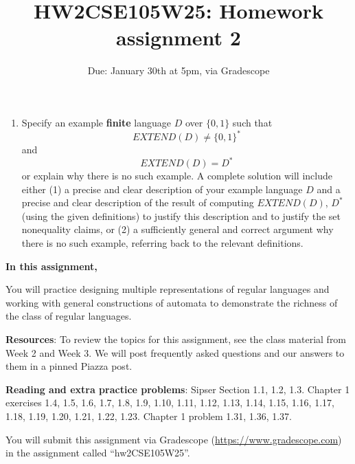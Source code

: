 \begin{enumerate}[wide, labelwidth=!, labelindent=0pt]
\begin{enumerate}
    \item\gradeCorrect Specify an example {\bf finite} language $D$ over $\{0,1\}$ such that 
    $$EXTEND(D) \neq \{0,1\}^*$$ and $$EXTEND(D) = D^*$$or 
    explain why there is no such example.
    A complete solution will include either (1) a precise and
    clear description of your example language $D$ 
    and a precise and clear description of
    the result of computing $EXTEND(D)$, $D^*$ (using the given definitions)
    to justify this description and to justify the set nonequality claims, 
    or (2) a sufficiently general and correct argument
    why there is no such example, referring back to the relevant definitions.
    \end{enumerate}



    
    \end{enumerate}
\newpage

\title{HW2CSE105W25: Homework assignment 2}
\date{Due: January 30th at 5pm, via Gradescope}



\maketitle
\thispagestyle{fancy}

{\bf In this assignment,}

You will practice designing multiple representations of regular languages and working with 
general constructions of automata to demonstrate the richness of the class of regular languages.


{\bf Resources}: To review the topics 
for this assignment, see the class material from Week 2 and Week 3.
We will post frequently asked questions and our answers to them in a 
pinned Piazza post. 

{\bf Reading and extra practice problems}:  
Sipser Section 1.1, 1.2, 1.3. 
Chapter 1 exercises 1.4, 1.5, 1.6, 1.7, 1.8, 1.9, 1.10, 1.11, 1.12, 1.13, 1.14, 1.15, 
1.16, 1.17, 1.18, 1.19, 1.20, 1.21, 1.22, 1.23. Chapter 1 problem 1.31, 
1.36, 1.37.

\instructions

You will submit this assignment via Gradescope
(\href{https://www.gradescope.com}{https://www.gradescope.com}) 
in the assignment called ``hw2CSE105W25''.

